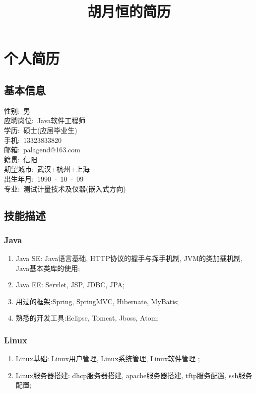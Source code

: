 \documentclass[12pt]{ctexart}
\title{胡月恒的简历}
\begin{document}
\maketitle
\tableofcontents

\section{个人简历}
\label{sec-1}
\subsection{基本信息}
\label{sec-1-1}
性别:\ 男\\
应聘岗位:\ Java软件工程师\\
学历:\ 硕士(应届毕业生)\\
手机:\ 13323833820\\
邮箱:\ palagend@163.com\\
籍贯:\ 信阳\\
期望城市:\ 武汉+杭州+上海\\
出生年月:\ 1990\ -\ 10\ -\ 09\\
专业:\ 测试计量技术及仪器(嵌入式方向)\\
\subsection{技能描述}
\label{sec-1-2}
\subsubsection{Java}
\label{sec-1-2-1}
\begin{enumerate}
\item Java SE: Java语言基础, HTTP协议的握手与挥手机制, JVM的类加载机制, Java基本类库的使用;
\item Java EE: Servlet, JSP, JDBC, JPA;
\item 用过的框架:Spring, SpringMVC, Hibernate, MyBatis;
\item 熟悉的开发工具:Eclipse, Tomcat, Jboss, Atom;
\end{enumerate}
\subsubsection{Linux}
\label{sec-1-2-2}
\begin{enumerate}
\item Linux基础: Linux用户管理, Linux系统管理, Linux软件管理 ;
\item Linux服务器搭建: dhcp服务器搭建, apache服务器搭建, tftp服务配置, ssh服务配置;
\end{enumerate}
\end{document}
